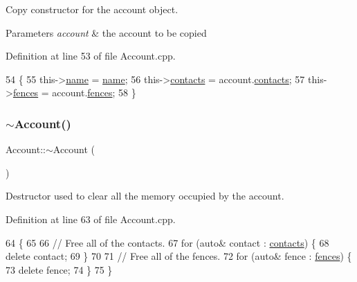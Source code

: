 Copy constructor for the account object.


\begin{DoxyParams}{Parameters}
{\em account} & the account to be copied \\
\hline
\end{DoxyParams}


Definition at line 53 of file Account.\+cpp.


\begin{DoxyCode}
54 \{
55     this->\hyperlink{class_account_a586e2c3461c5231eacf7c96851024a75}{name} = \hyperlink{class_account_a586e2c3461c5231eacf7c96851024a75}{name};
56     this->\hyperlink{class_account_aa4f77abd7c44f2a70b0cff8088e3491f}{contacts} = account.\hyperlink{class_account_aa4f77abd7c44f2a70b0cff8088e3491f}{contacts};
57     this->\hyperlink{class_account_ad92a9e8008371f34da06cd416a716fa1}{fences} = account.\hyperlink{class_account_ad92a9e8008371f34da06cd416a716fa1}{fences};
58 \}
\end{DoxyCode}
\mbox{\label{class_account_a569c9ef0e42b9157690b4ceb646daba8}} 
\subsubsection{\texorpdfstring{$\sim$\+Account()}{~Account()}}
{\footnotesize\ttfamily Account\+::$\sim$\+Account (\begin{DoxyParamCaption}{ }\end{DoxyParamCaption})}

Destructor used to clear all the memory occupied by the account. 

Definition at line 63 of file Account.\+cpp.


\begin{DoxyCode}
64 \{
65 
66     \textcolor{comment}{// Free all of the contacts.}
67     \textcolor{keywordflow}{for} (\textcolor{keyword}{auto}& contact : \hyperlink{class_account_aa4f77abd7c44f2a70b0cff8088e3491f}{contacts}) \{
68         \textcolor{keyword}{delete} contact;
69     \}
70 
71     \textcolor{comment}{// Free all of the fences.}
72     \textcolor{keywordflow}{for} (\textcolor{keyword}{auto}& fence : \hyperlink{class_account_ad92a9e8008371f34da06cd416a716fa1}{fences}) \{
73         \textcolor{keyword}{delete} fence;
74     \}
75 \}
\end{DoxyCode}


